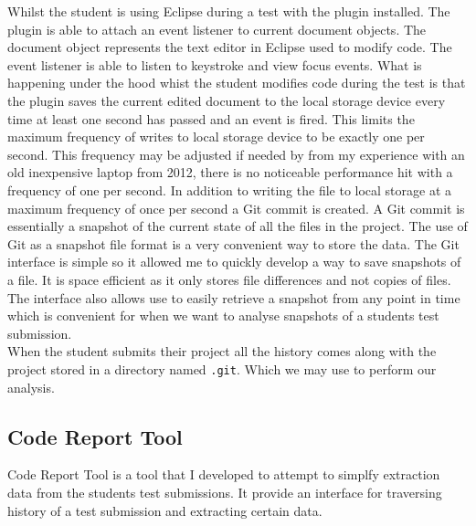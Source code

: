 \documentclass[twocolumn]{article}
\begin{document}
Whilst the student is using Eclipse during a test with the plugin installed.
The plugin is able to attach an event listener to current document objects. The
document object represents the text editor in Eclipse used to modify code. The
event listener is able to listen to keystroke and view focus events. What is
happening under the hood whist the student modifies code during the test is
that the plugin saves the current edited document to the local storage device
every time at least one second has passed and an event is fired. This limits
the maximum frequency of writes to local storage device to be exactly one per
second. This frequency may be adjusted if needed by from my experience with an
old inexpensive laptop from 2012, there is no noticeable performance hit with a
frequency of one per second. In addition to writing the file to local storage
at a maximum frequency of once per second a Git commit is created. A Git commit
is essentially a snapshot of the current state of all the files in the project.
The use of Git as a snapshot file format is a very convenient way to store the
data. The Git interface is simple so it allowed me to quickly develop a way to
save snapshots of a file. It is space efficient as it only stores file
differences and not copies of files. The interface also allows use to easily
retrieve a snapshot from any point in time which is convenient for when we want
to analyse snapshots of a students test submission.\\

When the student submits their project all the history comes along with the
project stored in a directory named \texttt{.git}. Which we may use to perform
our analysis.

\subsection{Code Report Tool}

Code Report Tool is a tool that I developed to attempt to simplfy extraction
data from the students test submissions. It provide an interface for traversing
history of a test submission and extracting certain data.\\
\end{document}
